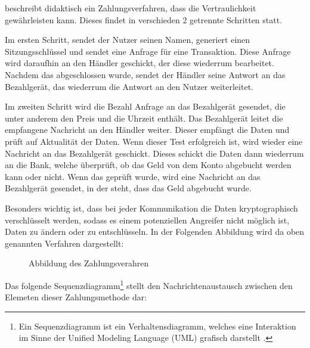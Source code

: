 \cite{refart:JTAS} beschreibt didaktisch ein Zahlungsverfahren, dass die Vertraulichkeit gewährleisten kann.
Dieses findet in verschieden 2 getrennte Schritten statt.

Im ersten Schritt, sendet der Nutzer seinen Namen, generiert einen Sitzungsschlüssel und sendet eine Anfrage für
eine Transaktion. Diese Anfrage wird daraufhin an den Händler geschickt, der diese wiederrum bearbeitet. Nachdem 
das abgeschlossen wurde, sendet der Händler seine Antwort an das Bezahlgerät, das wiederrum die Antwort an den Nutzer
weiterleitet. 

Im zweiten Schritt wird die Bezahl Anfrage an das Bezahlgerät gesendet, die unter anderem den Preis und die Uhrzeit enthält.
Das Bezahlgerät leitet die empfangene Nachricht an den Händler weiter. Dieser empfängt die Daten und prüft auf
Aktualität der Daten. Wenn dieser Test erfolgreich ist, wird wieder eine Nachricht an das Bezahlgerät geschickt. 
Dieses schickt die Daten dann wiederrum an die Bank, welche überprüft, ob das Geld von dem Konto abgebucht werden
kann oder nicht. Wenn das geprüft wurde, wird eine Nachricht an das Bezahlgerät gesendet, in der steht, dass das 
Geld abgebucht wurde. 

Besonders wichtig ist, dass bei jeder Kommunikation die Daten kryptographisch verschlüsselt werden, sodass es einem 
potenziellen Angreifer nicht möglich ist, Daten zu ändern oder zu entschlüsseln. In der Folgenden Abbildung wird
da oben genannten Verfahren dargestellt:

\begin{figure}[H]
    \caption{Abbildung des Zahlungsverahren \cite{refart:JTAS}}
    \label{fig:refart:JTAS}
\end{figure}

Das folgende Sequenzdiagramm\footnote{Ein Sequenzdiagramm ist ein Verhaltensdiagramm, welches eine Interaktion
im Sinne der Unified Modeling Language (UML) grafisch darstellt \cite{refbook:IASE}.} stellt den 
Nachrichtenaustausch zwischen den Elemeten dieser Zahlungsmethode dar:

